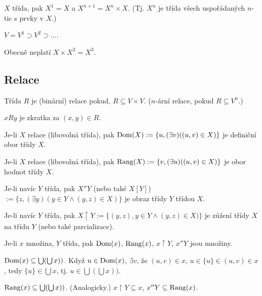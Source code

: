 \documentclass[12pt]{article}                   %
\begin{document}
        \begin{definice}[Mocnina]
            $X$ třída, pak $X^1 = X$ a $X^{n+1} = X^n\times X$. (Tj. $X^n$ je třída všech uspořádaných $n$-tic s prvky v $X$.)
        \end{definice}

        \begin{pozorovani}
            $V = V^1 \supset V^2 \supset …$.
        \end{pozorovani}

        \begin{priklad}
            Obecně neplatí $X \times X^2 = X^3$.
        \end{priklad}

    \subsection{Relace}
        \begin{definice}[Relace]
            Třída $R$ je (binární) relace pokud, $R \subseteq V \times V$. ($n$-ární relace, pokud $R \subseteq V^n$.)

            $xRy$ je zkratka za $(x, y) \in R$.
        \end{definice}

        \begin{definice}
            Je-li $X$ relace (libovolná třída), pak $\operatorname{Dom}(X) := \{u, (\exists v)((u, v) \in X)\}$ je definiční obor třídy $X$.

            Je-li $X$ relace (libovolná třída), pak $\operatorname{Rang}(X) := \{v, (\exists u)((u, v) \in X)\}$ je obor hodnot třídy $X$.

            Je-li navíc $Y$ třída, pak $X''Y$ (nebo také $X[Y]$) $:= \{z, (\exists y)(y \in Y \land (y, z) \in X)\}$ je obraz třídy $Y$ třídou $X$.

            Je-li navíc $Y$ třída, pak $X\upharpoonright Y := \{(y, z), y \in Y \land (y, z) \in X)\}$ je zúžení třídy $X$ na třídu $Y$ (nebo také parcializace).
        \end{definice}
       
        \begin{lemma}
            Je-li $x$ množina, $Y$ třída, pak $\operatorname{Dom}(x)$, $\operatorname{Rang}(x)$, $x \upharpoonright Y$, $x''Y$ jsou množiny.

            \begin{dukazin}
                $\operatorname{Dom}(x) \subseteq \bigcup(\bigcup x))$. Když $u \in \operatorname{Dom}(x)$, $\exists v$, že $(u, v) \in x$, $u \in \{u\} \in (u, v) \in x$, tedy $\{u\} \in \bigcup x$, tj. $u \in \bigcup(\bigcup x))$.

                $\operatorname{Rang}(x) \subseteq \bigcup(\bigcup x))$. (Analogicky.) $x \upharpoonright Y \subseteq x$, $x''Y \subseteq \operatorname{Rang}(x)$.
            \end{dukazin}
        \end{lemma}
\end{document}
